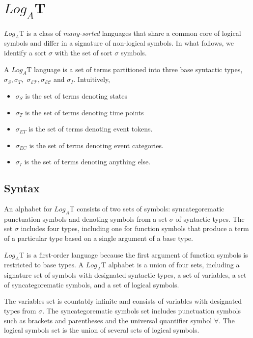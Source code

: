\chapter{$Log_A$T}

$Log_A$T is a class of \textit{many-sorted} languages that share a common core of logical symbols and differ in a signature of non-logical symbols. In what follows, we identify a sort $\sigma$ with
the set of sort $\sigma$ symbols.

A $Log_A$T language is a set of terms partitioned into three base syntactic types, $\sigma_S , \sigma_T,$
$\sigma_{\mathcal{ET}}, \sigma_{\mathcal{EC}}$
and $\sigma_I$. Intuitively,
\begin{itemize}
	\item $\sigma_S$ is the set of terms denoting states
	\item $\sigma_T$ is the set of terms denoting time points
	\item $\sigma_{ET}$ is the set of terms denoting event tokens.
	\item $\sigma_{EC}$ is the set of terms denoting event categories.
	\item $\sigma_I$ is the set of terms denoting anything else.
\end{itemize}

\section{Syntax}

An alphabet for $Log_A$T consists of two sets of symbols: syncategorematic punctuation symbols and denoting symbols from a set $\sigma$ of syntactic types. The set $\sigma$ includes four types, including one for function symbols that produce a term of a particular type based on a single argument of a base type.

$Log_A$T is a first-order language because the first argument of function symbols is restricted to base types. A $Log_A$T alphabet is a union of four sets, including a signature set of symbols with designated syntactic types, a set of variables, a set of syncategorematic symbols, and a set of logical symbols.

The variables set is countably infinite and consists of variables with designated types from $\sigma$. The syncategorematic symbols set includes punctuation symbols such as brackets and parentheses and the universal quantifier symbol $\forall$. The logical symbols set is the union of several sets of logical symbols.

